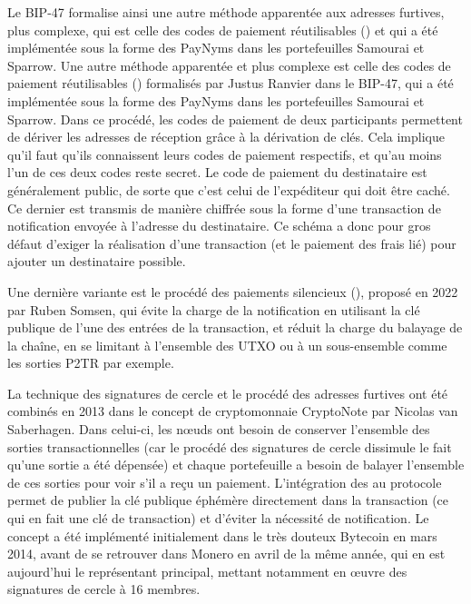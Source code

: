 Le BIP-47 formalise ainsi une autre méthode apparentée aux adresses furtives, plus complexe, qui est celle des codes de paiement réutilisables () et qui a été implémentée sous la forme des PayNyms dans les portefeuilles Samourai et Sparrow. Une autre méthode apparentée et plus complexe est celle des codes de paiement réutilisables () formalisés par Justus Ranvier dans le BIP-47, qui a été implémentée sous la forme des PayNyms dans les portefeuilles Samourai et Sparrow. Dans ce procédé, les codes de paiement de deux participants permettent de dériver les adresses de réception grâce à la dérivation de clés. Cela implique qu'il faut qu'ils connaissent leurs codes de paiement respectifs, et qu'au moins l'un de ces deux codes reste secret. Le code de paiement du destinataire est généralement public, de sorte que c'est celui de l'expéditeur qui doit être caché. Ce dernier est transmis de manière chiffrée sous la forme d'une transaction de notification envoyée à l'adresse du destinataire. Ce schéma a donc pour gros défaut d'exiger la réalisation d'une transaction (et le paiement des frais lié) pour ajouter un destinataire possible.

Une dernière variante est le procédé des paiements silencieux (), proposé en 2022 par Ruben Somsen, qui évite la charge de la notification en utilisant la clé publique de l'une des entrées de la transaction, et réduit la charge du balayage de la chaîne, en se limitant à l'ensemble des UTXO ou à un sous-ensemble comme les sorties P2TR par exemple.

La technique des signatures de cercle et le procédé des adresses furtives ont été combinés en 2013 dans le concept de cryptomonnaie CryptoNote par Nicolas van Saberhagen. Dans celui-ci, les nœuds ont besoin de conserver l'ensemble des sorties transactionnelles (car le procédé des signatures de cercle dissimule le fait qu'une sortie a été dépensée) et chaque portefeuille a besoin de balayer l'ensemble de ces sorties pour voir s'il a reçu un paiement. L'intégration des  au protocole permet de publier la clé publique éphémère directement dans la transaction (ce qui en fait une clé de transaction) et d'éviter la nécessité de notification. Le concept a été implémenté initialement dans le très douteux Bytecoin en mars 2014, avant de se retrouver dans Monero en avril de la même année, qui en est aujourd'hui le représentant principal, mettant notamment en œuvre des signatures de cercle à 16 membres.

